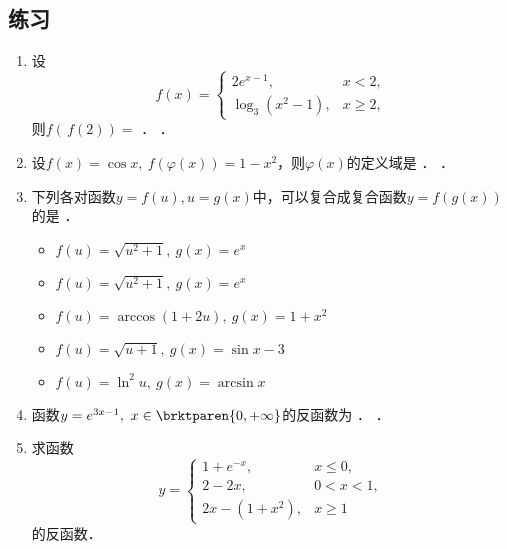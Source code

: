 \ifshowex
{}
\subsection*{练习}

\begin{enumerate}
\item 设
  \[
    f(x) =
    \begin{cases}
      2e^{x-1}, & x < 2, \\
      \log_3(x^2-1), & x \ge 2,
    \end{cases}
  \]
  则\(f(\,f(2)) =\)
  \ifshowsol
  \uline{}．
  \else
  \uline{\makebox[3em]{}}．
  \fi

\item 设\(f(x) = \cos x,\ f(\varphi(x)) = 1 - x^2\)，则\(\varphi(x)\)的定义域是
  \ifshowsol
  {\setlength{\ULdepth}{.8ex}%
    \uline{}}．
  \else
  \uline{\makebox[6em]{}}．
  \fi

\item 下列各对函数\(y = f(u), u = g(x)\)中，可以复合成复合函数\(y = f(g(x))\)的是
  \uline{\hfill}．
  \begin{itemize}
    \renewcommand{\labelitemi}{\faCircleThin}
    \ifshowsol
  \item[\faCircle] \(f(u) = \sqrt{u^2 + 1},\ g(x) = e^x\)
    \else
  \item \(f(u) = \sqrt{u^2 + 1},\ g(x) = e^x\)
    \fi
  \item \(f(u) = \arccos(1+2u),\ g(x) = 1 + x^2\)
  \item \(f(u) = \sqrt{u+1},\ g(x) = \sin x - 3\)
  \item \(f(u) = \ln^2 u,\ g(x) = \arcsin x\)
  \end{itemize}

\item 函数\(y = e^{3x-1},\ x \in \brktparen{0, +\infty}\)的反函数为
  \ifshowsol
  {\setlength{\ULdepth}{.85ex}%
    \uline{}}．
  \else
  \uline{\makebox[15em]{}}．
  \fi

\item 求函数
  \[
    y =
    \begin{cases}
      1 + e^{-x}, & x \le 0, \\
      2 - 2x, & 0 < x < 1, \\
      2x - (1+x^2), & x \ge 1
    \end{cases}
  \]
  的反函数．


\end{enumerate}

